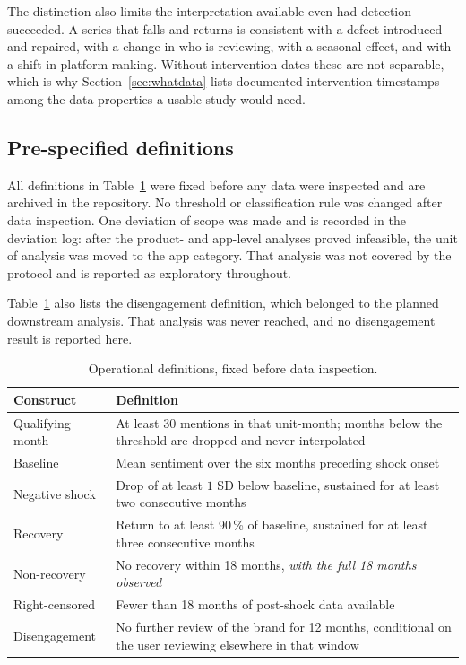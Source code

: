 \documentclass[11pt,a4paper]{article}
\makeatletter
\let\original@subsection\subsection
\renewcommand{\subsection}{\FloatBarrier\original@subsection}%
\makeatother
\begin{document}
The distinction also limits the interpretation available even had detection
succeeded. A series that falls and returns is consistent with a defect
introduced and repaired, with a change in who is reviewing, with a seasonal
effect, and with a shift in platform ranking. Without intervention dates these
are not separable, which is why Section~\ref{sec:whatdata} lists documented
intervention timestamps among the data properties a usable study would need.

\subsection{Pre-specified definitions}

All definitions in Table~\ref{tab:definitions} were fixed before any data were
inspected and are archived in the repository. No threshold or classification
rule was changed after data inspection. One deviation of scope was made and is
recorded in the deviation log: after the product- and app-level analyses proved
infeasible, the unit of analysis was moved to the app category. That analysis
was not covered by the protocol and is reported as exploratory throughout.

Table~\ref{tab:definitions} also lists the disengagement definition, which
belonged to the planned downstream analysis. That analysis was never reached,
and no disengagement result is reported here.

\begin{table}[htbp]
\centering
\caption{Operational definitions, fixed before data inspection.}
\label{tab:definitions}
\small
\begin{tabular}{@{}p{3.4cm}p{10.2cm}@{}}
\toprule
\textbf{Construct} & \textbf{Definition} \\
\midrule
Qualifying month & At least 30 mentions in that unit-month; months below the
threshold are dropped and never interpolated \\
Baseline & Mean sentiment over the six months preceding shock onset \\
Negative shock & Drop of at least $1$ SD below baseline, sustained for at
least two consecutive months \\
Recovery & Return to at least 90\,\% of baseline, sustained for at least three
consecutive months \\
Non-recovery & No recovery within 18 months, \emph{with the full 18 months
observed} \\
Right-censored & Fewer than 18 months of post-shock data available \\
Disengagement & No further review of the brand for 12 months, conditional on
the user reviewing elsewhere in that window \\
\bottomrule
\end{tabular}
\end{table}
\end{document}
